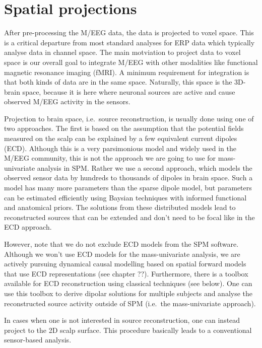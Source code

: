 \chapter{Spatial projections \label{ch:eeg_source}}

After pre-processing the M/EEG data, the data is projected to voxel
space. This is a critical departure from most standard analyses for
ERP data which typically analyse data in channel space. The main
motviation to project data to voxel space is our overall goal to integrate
M/EEG with other modalities like functional magnetic resonance imaging
(fMRI). A minimum requirement for integration is that both kinds of
data are in the same space. Naturally, this space is the 3D-brain
space, because it is here where neuronal sources are active and cause
observed M/EEG activity in the sensors. 

Projection to brain space, i.e.~source reconstruction, is usually done
using one of two approaches. The first is based on the assumption that
the potential fields measured on the scalp can be explained by a few
equivalent current dipoles (ECD). Although this is a very parsimonious
model and widely used in the M/EEG community, this is not the approach
we are going to use for mass-univariate analysis in SPM. Rather we use
a second approach, which models the observed sensor data by hundreds to
thousands of dipoles in brain space. Such a model has many more
parameters than the sparse dipole model, but parameters can be
estimated efficiently using Baysian techniques with informed
functional and anatomical priors. The solutions from these distributed
models lead to reconstructed sources that can be extended and don't
need to be focal like in the ECD approach.

However, note that we do not exclude ECD models from the SPM
software. Although we won't use ECD models for the mass-univariate
analysis, we are actively pursuing dynamical causal modelling based on
spatial forward models that use ECD representations (see chapter
??). Furthermore, there is a toolbox available for ECD reconstruction
using classical techniques (see below). One can use this toolbox to derive
dipolar solutions for multiple subjects and analyse the reconstructed
source activity outside of SPM (i.e.~the mass-univariate approach).

In cases when one is not interested in source reconstruction, one can
instead project to the 2D scalp surface. This procedure basically
leads to a conventional sensor-based analysis. 

